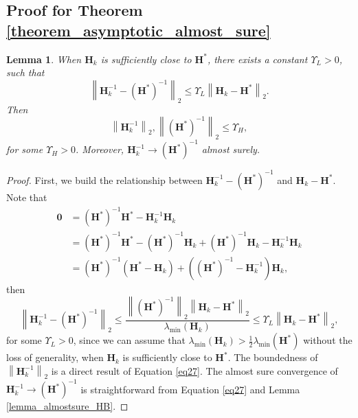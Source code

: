 \documentclass[aos]{imsart}
\numberwithin{equation}{section}
\theoremstyle{plain}
\newtheorem{lemma}{Lemma}
\begin{document}
\begin{appendix}
\subsection{Proof for Theorem \ref{theorem_asymptotic_almost_sure}}
\label{sec:appendix3.3}

\begin{lemma}
\label{lemma26}
    When $\bm{H}_k$ is sufficiently close to $\bm{H}^{*}$, there exists a constant $\Upsilon_{L} > 0$, such that 
    \begin{equation}
    \label{eq27}
         \left\| \bm{H}_k^{-1} - \left(\bm{H}^{*}\right)^{-1}  \right\|_2 \leq  \Upsilon_{L} \left\| \bm{H}_k - \bm{H}^{*} \right\|_2.
    \end{equation}
    Then 
    \begin{equation*}
        \left\|  \bm{H}_k^{-1} \right\|_2, \left\|  \left(\bm{H}^{*}\right)^{-1} \right\|_2 \leq \Upsilon_{H},
    \end{equation*}
    for some $\Upsilon_{H} > 0$. Moreover, $\bm{H}_k^{-1} \to \left(\bm{H}^{*}\right)^{-1}$ almost surely.
\end{lemma}


\begin{proof}
     First, we build the relationship between $\bm{H}_k^{-1} - \left(\bm{H}^{*}\right)^{-1}$ and $\bm{H}_k - \bm{H}^{*}$. Note that
    \begin{equation}
        \begin{split}
            \bm{0} & =  \left(\bm{H}^{*}\right)^{-1} \bm{H}^{*} - \bm{H}_k^{-1}\bm{H}_k\\
            & = \left(\bm{H}^{*}\right)^{-1} \bm{H}^{*} - \left(\bm{H}^{*}\right)^{-1} \bm{H}_{k} + \left(\bm{H}^{*}\right)^{-1} \bm{H}_{k} - \bm{H}_k^{-1}\bm{H}_k \\
            & = \left(\bm{H}^{*}\right)^{-1}  \left( \bm{H}^{*} - \bm{H}_{k}  \right) + \left( \left(\bm{H}^{*}\right)^{-1} - \bm{H}_k^{-1}\right) \bm{H}_k ,
        \end{split}
    \end{equation}
    then 
    \begin{equation}
        \left\| \bm{H}_k^{-1} - \left(\bm{H}^{*}\right)^{-1}  \right\|_2 \leq \frac{\left\|\left(\bm{H}^{*}\right)^{-1} \right\|_2 \left\| \bm{H}_k - \bm{H}^{*} \right\|_2}{\lambda_{\min}\left( \bm{H}_{k} \right)} \leq \Upsilon_{L} \left\| \bm{H}_k - \bm{H}^{*} \right\|_2,
    \end{equation}
    for some $\Upsilon_{L}>0$, since we can assume that $\lambda_{\min}\left( \bm{H}_{k} \right) > \frac{1}{2} \lambda_{\min}\left( \bm{H}^{*} \right)$  without the loss of generality, when $\bm{H}_k$ is sufficiently close to $\bm{H}^{*}$. The boundedness of $\left\|  \bm{H}_k^{-1} \right\|_2$ is a direct result of Equation \eqref{eq27}.  The almost sure convergence of $\bm{H}_k^{-1} \to \left(\bm{H}^{*}\right)^{-1}$ is straightforward from Equation \eqref{eq27} and Lemma \ref{lemma_almostsure_HB}.
\end{proof}




\end{appendix}
\end{document}
